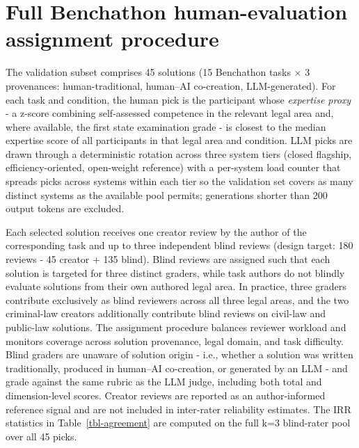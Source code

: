 \documentclass[11pt]{article}
\begin{document}


\section{Full Benchathon human-evaluation assignment
procedure}\label{full-benchathon-human-evaluation-assignment-procedure}

The validation subset comprises 45 solutions (15 Benchathon tasks × 3
provenances: human-traditional, human--AI co-creation, LLM-generated).
For each task and condition, the human pick is the participant whose
\emph{expertise proxy} - a z-score combining self-assessed competence in
the relevant legal area and, where available, the first state
examination grade - is closest to the median expertise score of all
participants in that legal area and condition. LLM picks are drawn
through a deterministic rotation across three system tiers (closed
flagship, efficiency-oriented, open-weight reference) with a per-system
load counter that spreads picks across systems within each tier so the
validation set covers as many distinct systems as the available pool
permits; generations shorter than 200 output tokens are excluded.

Each selected solution receives one creator review by the author of the
corresponding task and up to three independent blind reviews (design
target: 180 reviews - 45 creator + 135 blind). Blind reviews are
assigned such that each solution is targeted for three distinct graders,
while task authors do not blindly evaluate solutions from their own
authored legal area. In practice, three graders contribute exclusively
as blind reviewers across all three legal areas, and the two
criminal-law creators additionally contribute blind reviews on civil-law
and public-law solutions. The assignment procedure balances reviewer
workload and monitors coverage across solution provenance, legal domain,
and task difficulty. Blind graders are unaware of solution origin -
i.e., whether a solution was written traditionally, produced in
human--AI co-creation, or generated by an LLM - and grade against the
same rubric as the LLM judge, including both total and dimension-level
scores. Creator reviews are reported as an author-informed reference
signal and are not included in inter-rater reliability estimates. The
IRR statistics in Table~\ref{tbl-agreement} are computed on the full k=3
blind-rater pool over all 45 picks.
\end{document}
